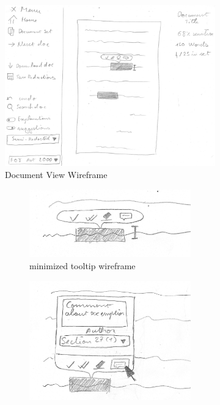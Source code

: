 \documentclass{l4proj}
\begin{document}
\begin{figure}
    \centering
    \begin{subfigure}[b]{\linewidth}
        \centering
        \includegraphics[width=0.6\linewidth]{images/wireframe_doc_view.jpg}
        \caption{Document View Wireframe}
        \label{fig:document-wireframe}
    \end{subfigure}
    \begin{subfigure}[b]{\linewidth}
        \begin{subfigure}[b]{0.5\linewidth}
            \includegraphics[width=\linewidth]{images/wireframe_tooltip.jpg}
            \caption{minimized tooltip wireframe}
            \label{fig:tooltip-wireframe}
        \end{subfigure}
        \begin{subfigure}[b]{0.4\linewidth}
            \includegraphics[width=\linewidth]{images/wireframe_tooltip_comment.jpg}

\end{subfigure}
\end{subfigure}
\end{figure}
\end{document}
